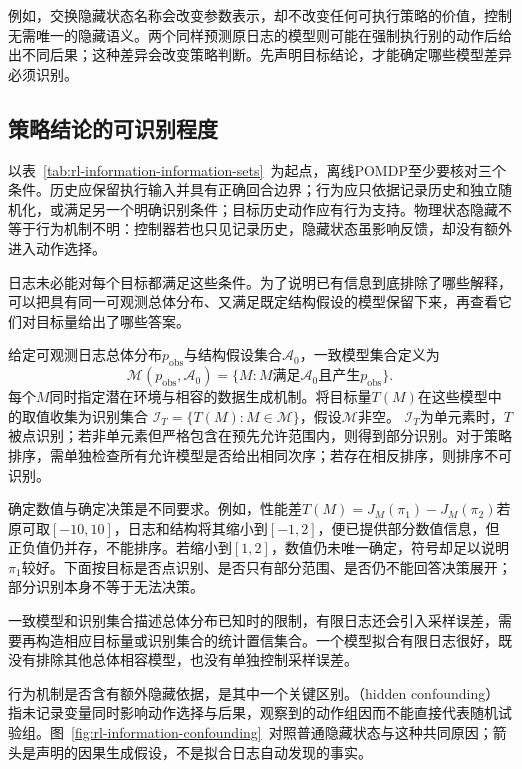 例如，交换隐藏状态名称会改变参数表示，却不改变任何可执行策略的价值，控制无需唯一的隐藏语义。两个同样预测原日志的模型则可能在强制执行别的动作后给出不同后果；这种差异会改变策略判断。先声明目标结论，才能确定哪些模型差异必须识别。

\subsection{策略结论的可识别程度}
\label{sec:rl-information-identification-levels}

以表~\ref{tab:rl-information-information-sets}~为起点，离线POMDP至少要核对三个条件。历史应保留执行输入并具有正确回合边界；行为应只依据记录历史和独立随机化，或满足另一个明确识别条件；目标历史动作应有行为支持。物理状态隐藏不等于行为机制不明：控制器若也只见记录历史，隐藏状态虽影响反馈，却没有额外进入动作选择。

日志未必能对每个目标都满足这些条件。为了说明已有信息到底排除了哪些解释，可以把具有同一可观测总体分布、又满足既定结构假设的模型保留下来，再查看它们对目标量给出了哪些答案。

\begin{definition}[一致模型集合与识别集合]
  \label{def:rl-information-identified-set}
  给定可观测日志总体分布$p_{\mathrm{obs}}$与结构假设集合$\mathcal A_0$，一致模型集合定义为
  \[
    \mathcal M(p_{\mathrm{obs}},\mathcal A_0)
       =\{M:M\text{满足}\mathcal A_0
                  \text{且产生}p_{\mathrm{obs}}\}.
  \]
  每个$M$同时指定潜在环境与相容的数据生成机制。将目标量$T(M)$在这些模型中的取值收集为识别集合
  $\mathcal I_T=\{T(M):M\in\mathcal M\}$，假设$\mathcal M$非空。
  $\mathcal I_T$为单元素时，$T$被点识别；若非单元素但严格包含在预先允许范围内，则得到部分识别。对于策略排序，需单独检查所有允许模型是否给出相同次序；若存在相反排序，则排序不可识别。
\end{definition}

确定数值与确定决策是不同要求。例如，性能差$T(M)=J_M(\pi_1)-J_M(\pi_2)$若原可取$[-10,10]$，日志和结构将其缩小到$[-1,2]$，便已提供部分数值信息，但正负值仍并存，不能排序。若缩小到$[1,2]$，数值仍未唯一确定，符号却足以说明$\pi_1$较好。下面按目标是否点识别、是否只有部分范围、是否仍不能回答决策展开；部分识别本身不等于无法决策。

一致模型和识别集合描述总体分布已知时的限制，有限日志还会引入采样误差，需要再构造相应目标量或识别集合的统计置信集合。一个模型拟合有限日志很好，既没有排除其他总体相容模型，也没有单独控制采样误差。

行为机制是否含有额外隐藏依据，是其中一个关键区别。（hidden confounding）指未记录变量同时影响动作选择与后果，观察到的动作组因而不能直接代表随机试验组。图~\ref{fig:rl-information-confounding}~对照普通隐藏状态与这种共同原因；箭头是声明的因果生成假设，不是拟合日志自动发现的事实。

